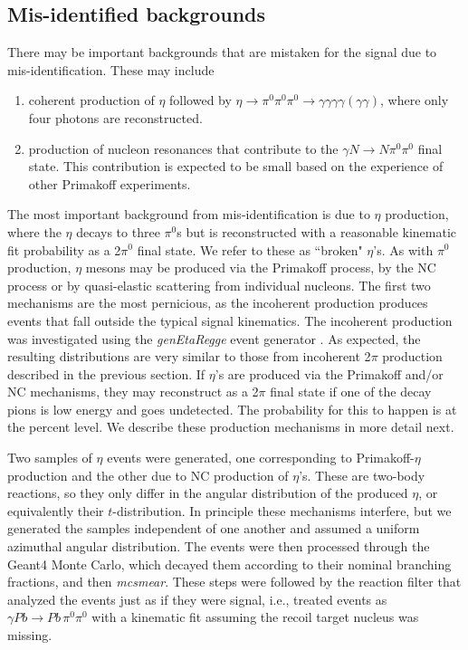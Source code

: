 \subsection{Mis-identified backgrounds}

There may be important backgrounds that are mistaken for the signal
due to mis-identification. These may include

\begin{enumerate}[label=(\roman*)]
    \item coherent production of $\eta$ followed by $\eta\rightarrow
      \pi^0\pi^0\pi^0 \rightarrow
      \gamma\gamma\gamma\gamma(\gamma\gamma)$, where only four photons
      are reconstructed.
    \item production of nucleon resonances that contribute to the
      $\gamma N \rightarrow N \pi^0\pi^0$ final state. This
      contribution is expected to be small based on the experience of
      other Primakoff experiments.
\end{enumerate}
The most important background from mis-identification is due to
$\eta$ production, where the $\eta$ decays to three $\pi^0$s but is
reconstructed with a reasonable kinematic fit probability as a 2$\pi^0$ final
state. We refer to these as ``broken" $\eta$'s. As with $\pi^0$
production, $\eta$ mesons may be produced via the Primakoff process,
by the NC process or by quasi-elastic scattering from individual
nucleons. The first two mechanisms are the most pernicious, as the
incoherent production produces events that fall outside the typical
signal kinematics.  The incoherent production was investigated using
the {\em genEtaRegge} event generator \cite{hdnote2437}. As expected,
the resulting distributions are very similar to those from incoherent
2$\pi$ production described in the previous section.  If $\eta$'s are
produced via the Primakoff and/or NC mechanisms, they may reconstruct
as a 2$\pi$ final state if one of the decay pions is low energy and
goes undetected. The probability for this to happen is at the percent
level.  We describe these production mechanisms in more detail next.

Two samples of $\eta$ events were generated, one corresponding to
Primakoff-$\eta$ production and the other due to NC production of
$\eta$'s. These are two-body reactions, so they only differ in the
angular distribution of the produced $\eta$, or equivalently their
$t$-distribution. In principle these mechanisms interfere, but we
generated the samples independent of one another and assumed a
uniform azimuthal angular distribution. The events were then processed
through the Geant4 Monte Carlo, which decayed them according to their
nominal branching fractions, and then {\em mcsmear}. These steps were
followed by the reaction filter that analyzed the events just as if
they were signal, i.e., treated events as $\gamma Pb \rightarrow Pb\,
\pi^0 \pi^0$ with a kinematic fit assuming the recoil target nucleus
was missing.

